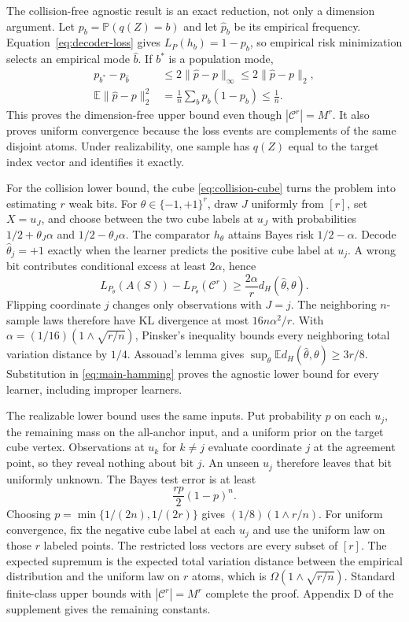 \documentclass[twoside]{article}
\newcommand{\E}{\mathbb E}
\newcommand{\Pp}{\mathbb P}
\newcommand{\C}{\mathcal C}
\begin{document}
The collision-free agnostic result is an exact reduction, not only a dimension argument. Let $p_b=\Pp(q(Z)=b)$ and let $\widehat p_b$ be its empirical frequency. Equation~\eqref{eq:decoder-loss} gives $L_P(h_b)=1-p_b$, so empirical risk minimization selects an empirical mode $\widehat b$. If $b^*$ is a population mode,
\begin{align*}
 p_{b^*}-p_{\widehat b}
 &\leq2\|\widehat p-p\|_\infty
 \leq2\|\widehat p-p\|_2,\\
 \E\|\widehat p-p\|_2^2
 &=\frac1n\sum_b p_b(1-p_b)\leq\frac1n.
\end{align*}
This proves the dimension-free upper bound even though $|\C^r|=M^r$. It also proves uniform convergence because the loss events are complements of the same disjoint atoms. Under realizability, one sample has $q(Z)$ equal to the target index vector and identifies it exactly.

For the collision lower bound, the cube \eqref{eq:collision-cube} turns the problem into estimating $r$ weak bits. For $\theta\in\{-1,+1\}^r$, draw $J$ uniformly from $[r]$, set $X=u_J$, and choose between the two cube labels at $u_J$ with probabilities $1/2+\theta_J\alpha$ and $1/2-\theta_J\alpha$. The comparator $h_\theta$ attains Bayes risk $1/2-\alpha$. Decode $\widehat\theta_j=+1$ exactly when the learner predicts the positive cube label at $u_j$. A wrong bit contributes conditional excess at least $2\alpha$, hence
\begin{equation}
 L_{P_\theta}(A(S))-L_{P_\theta}(\C^r)
 \geq \frac{2\alpha}{r}d_H(\widehat\theta,\theta).
 \label{eq:main-hamming}
\end{equation}
Flipping coordinate $j$ changes only observations with $J=j$. The neighboring $n$-sample laws therefore have KL divergence at most $16n\alpha^2/r$. With $\alpha=(1/16)(1\wedge\sqrt{r/n})$, Pinsker's inequality bounds every neighboring total variation distance by $1/4$. Assouad's lemma \citep{tsybakov2009} gives $\sup_\theta\E d_H(\widehat\theta,\theta)\geq3r/8$. Substitution in \eqref{eq:main-hamming} proves the agnostic lower bound for every learner, including improper learners.

The realizable lower bound uses the same inputs. Put probability $p$ on each $u_j$, the remaining mass on the all-anchor input, and a uniform prior on the target cube vertex. Observations at $u_k$ for $k\neq j$ evaluate coordinate $j$ at the agreement point, so they reveal nothing about bit $j$. An unseen $u_j$ therefore leaves that bit uniformly unknown. The Bayes test error is at least
\[
 \frac{rp}{2}(1-p)^n.
\]
Choosing $p=\min\{1/(2n),1/(2r)\}$ gives $(1/8)(1\wedge r/n)$. For uniform convergence, fix the negative cube label at each $u_j$ and use the uniform law on those $r$ labeled points. The restricted loss vectors are every subset of $[r]$. The expected supremum is the expected total variation distance between the empirical distribution and the uniform law on $r$ atoms, which is $\Omega(1\wedge\sqrt{r/n})$. Standard finite-class upper bounds \citep{devroye1996} with $|\C^r|=M^r$ complete the proof. Appendix D of the supplement gives the remaining constants.
\end{document}
